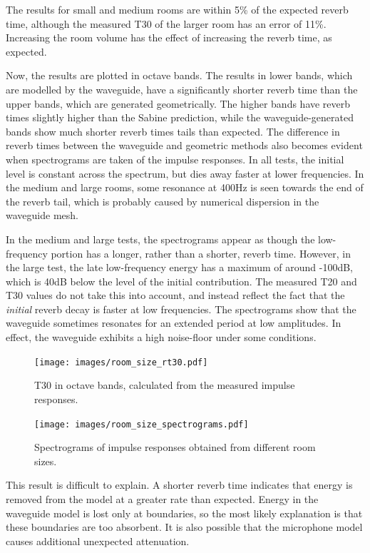 \documentclass[]{scrreprt}
\begin{document}
The results for small and medium rooms are within 5\% of the expected
reverb time, although the measured T30 of the larger room has an error
of 11\%. Increasing the room volume has the effect of increasing the
reverb time, as expected.

Now, the results are plotted in octave bands. The results in lower bands, which are
modelled by the waveguide, have a significantly shorter reverb time than
the upper bands, which are generated geometrically. The higher bands
have reverb times slightly higher than the Sabine prediction, while the
waveguide-generated bands show much shorter reverb times tails than
expected. The difference in reverb times between the waveguide and
geometric methods also becomes evident when spectrograms are taken of
the impulse responses. In all tests, the initial level is
constant across the spectrum, but dies away faster at lower frequencies.
In the medium and large rooms, some resonance at 400Hz is seen towards
the end of the reverb tail, which is probably caused by numerical
dispersion in the waveguide mesh.

In the medium and large tests, the spectrograms appear as though the
low-frequency portion has a longer, rather than a shorter, reverb time.
However, in the large test, the late low-frequency energy has a maximum
of around -100dB, which is 40dB below the level of the initial
contribution. The measured T20 and T30 values do not take this into
account, and instead reflect the fact that the \emph{initial} reverb
decay is faster at low frequencies. The spectrograms show that the
waveguide sometimes resonates for an extended period at low amplitudes.
In effect, the waveguide exhibits a high noise-floor under some
conditions.

\begin{figure}[htbp]
\centering
\texttt{[image: images/room\_size\_rt30.pdf]}
\caption{T30 in octave bands, calculated from the measured impulse
responses.\label{fig:room_size_rt30}}
\end{figure}

\begin{figure}[htbp]
\centering
\texttt{[image: images/room\_size\_spectrograms.pdf]}
\caption{Spectrograms of impulse responses obtained from different room
sizes.\label{fig:room_size_spectrograms}}
\end{figure}

This result is difficult to explain. A shorter reverb time indicates
that energy is removed from the model at a greater rate than expected.
Energy in the waveguide model is lost only at boundaries, so the most
likely explanation is that these boundaries are too absorbent. It is
also possible that the microphone model causes additional unexpected
attenuation.
\end{document}
